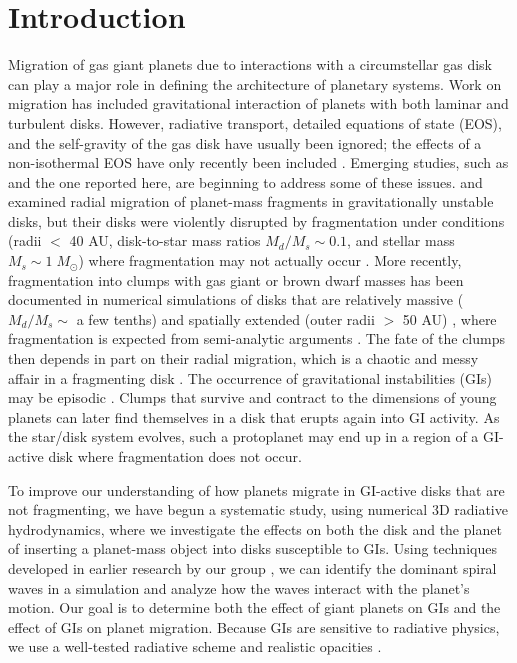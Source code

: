 \documentclass[12pt,manuscript,authoryear]{aastex}
\begin{document}
\label{firstpage}

\section{Introduction}

Migration of gas giant planets due to interactions with a circumstellar gas disk can play a major role in defining the
architecture of planetary systems. Work on migration \citep[see review by][]{papaloizou2007} has included gravitational
interaction of planets with both laminar and turbulent disks. However, radiative transport, detailed equations of state
(EOS), and the self-gravity of the gas disk have usually been ignored; the effects of a non-isothermal EOS have only
recently been included \citep[e.g.,][]{paardekooper2006,paardekooper2010,paardekooper2011}. Emerging studies, such as
\citet{baruteau2011} and the one reported here, are beginning to address some of these issues.  \citet{boss2005} and
\citet{mayer2004} examined radial migration of planet-mass fragments in gravitationally unstable disks, but their disks
were violently disrupted by fragmentation under conditions (radii $<$ 40 AU, disk-to-star mass ratios $M_d/M_s \sim
0.1$, and stellar mass $M_s \sim 1\;M_{\odot}$) where fragmentation may not actually occur
\citep{rafikov2005,rafikov2007,boley2006,boley2007b,boley2008,forgan2009,cai2010}. More recently, fragmentation into
clumps with gas giant or brown dwarf masses has been documented in numerical simulations of disks that are relatively
massive ($M_d/M_s \sim$ a few tenths) and spatially extended (outer radii $>$ 50 AU)
\citep{krumholz2007,stamatellos2007,stamatellos2009,boley2009,boley2010}, where fragmentation is expected from
semi-analytic arguments \citep[e.g.,][]{clarke2009,rafikov2009,dodson2009}. The fate of the clumps then depends in part
on their radial migration, which is a chaotic and messy affair in a fragmenting disk
\citep[e.g.,][]{boley2009,boley2010,vorobyov2010,boley2010b}. The occurrence of gravitational instabilities (GIs) may be
episodic \citep[e.g.,][]{vorobyov2006,vorobyov2010b,zhu2010}. Clumps that survive and contract to the dimensions of
young planets can later find themselves in a disk that erupts again into GI activity. As the star/disk system evolves,
such a protoplanet may end up in a region of a GI-active disk where fragmentation does not occur.

To improve our understanding of how planets migrate in GI-active disks that are not fragmenting, we have begun a
systematic study, using numerical 3D radiative hydrodynamics, where we investigate the effects on both the disk and the
planet of inserting a planet-mass object into disks susceptible to GIs. Using techniques developed in earlier research
by our group \citep{pickett2003, mejia2005,cai2006,cai2008,boley2006,boley2007b,michael2010}, we can identify the
dominant spiral waves in a simulation and analyze how the waves interact with the planet's motion. Our goal is to
determine both the effect of giant planets on GIs and the effect of GIs on planet migration. Because GIs are sensitive
to radiative physics, we use a well-tested radiative scheme \citep{boley2007b} and realistic opacities
\citep{dalessio2001}.
\end{document}
